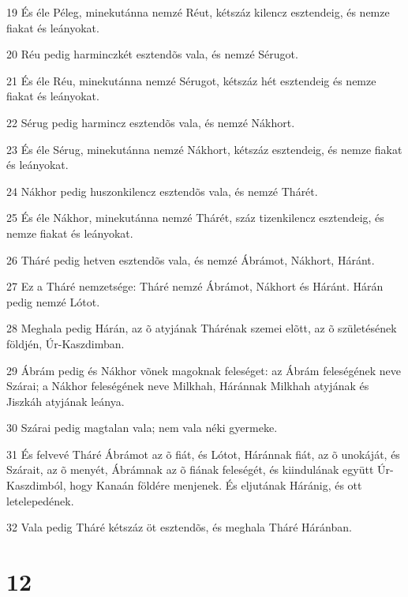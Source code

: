 \par 19 És éle Péleg, minekutánna nemzé Réut, kétszáz kilencz esztendeig, és nemze fiakat és leányokat.
\par 20 Réu pedig harminczkét esztendõs vala, és nemzé Sérugot.
\par 21 És éle Réu, minekutánna nemzé Sérugot, kétszáz hét esztendeig és nemze fiakat és leányokat.
\par 22 Sérug pedig harmincz esztendõs vala, és nemzé Nákhort.
\par 23 És éle Sérug, minekutánna nemzé Nákhort, kétszáz esztendeig, és nemze fiakat és leányokat.
\par 24 Nákhor pedig huszonkilencz esztendõs vala, és nemzé Thárét.
\par 25 És éle Nákhor, minekutánna nemzé Thárét, száz tizenkilencz esztendeig, és nemze fiakat és leányokat.
\par 26 Tháré pedig hetven esztendõs vala, és nemzé Ábrámot, Nákhort, Háránt.
\par 27 Ez a Tháré nemzetsége: Tháré nemzé Ábrámot, Nákhort és Háránt. Hárán pedig nemzé Lótot.
\par 28 Meghala pedig Hárán, az õ atyjának Thárénak szemei elõtt, az õ születésének földjén, Úr-Kaszdimban.
\par 29 Ábrám pedig és Nákhor võnek magoknak feleséget: az Ábrám feleségének neve Szárai; a Nákhor feleségének neve Milkhah, Háránnak Milkhah atyjának és Jiszkáh atyjának leánya.
\par 30 Szárai pedig magtalan vala; nem vala néki gyermeke.
\par 31 És felvevé Tháré Ábrámot az õ fiát, és Lótot, Háránnak fiát, az õ unokáját, és Szárait, az õ menyét, Ábrámnak az õ fiának feleségét, és kiindulának együtt Úr-Kaszdimból, hogy Kanaán földére menjenek. És eljutának Háránig, és ott letelepedének.
\par 32 Vala pedig Tháré kétszáz öt esztendõs, és meghala Tháré Háránban.

\chapter{12}

